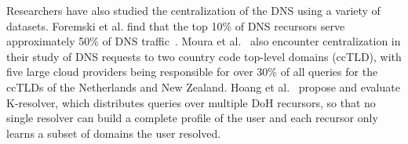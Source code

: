 Researchers have also studied the centralization of the DNS using a variety of datasets.
Foremski et al. find that the top 10\% of DNS recursors serve approximately 50\% of DNS traffic~\cite{foremski2019dns-observatory}.
Moura et al.~\cite{moura2020clouding} also encounter centralization in their study of DNS requests to two country code top-level domains (ccTLD), with five large cloud providers being responsible for over 30\% of all queries for the ccTLDs of the Netherlands and New Zealand.
Hoang et al.~\cite{hoang2020kresolver} propose and evaluate K-resolver, which distributes queries over multiple DoH recursors, so that no single resolver can build a complete profile of the user and each recursor only learns a subset of domains the user resolved. 
